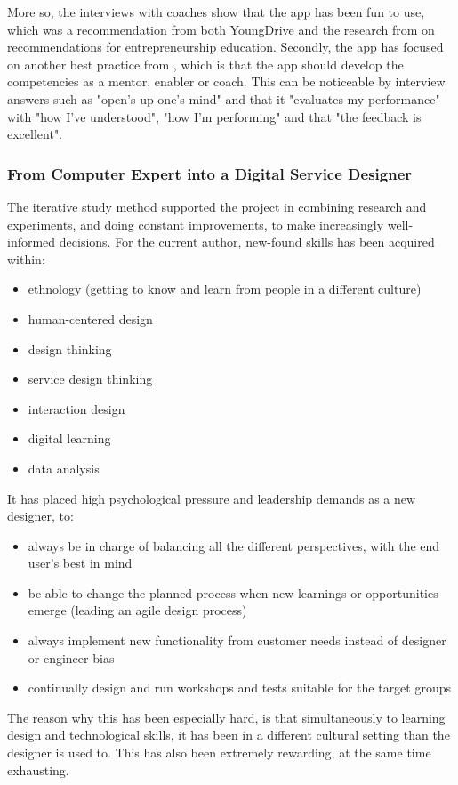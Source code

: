   More so, the interviews with coaches show that the app has been fun to use, which was a recommendation from both YoungDrive and the research from \cite{dickson} on recommendations for entrepreneurship education. Secondly, the app has focused on another best practice from \cite{dickson}, which is that the app should develop the competencies as a mentor, enabler or coach. This can be noticeable by interview answers such as "open's up one's mind" and that it "evaluates my performance" with "how I've understood", "how I'm performing" and that "the feedback is excellent".

  \subsubsection{From Computer Expert into a Digital Service Designer}
  The iterative study method supported the project in combining research and experiments, and doing constant improvements, to make increasingly well-informed decisions. For the current author, new-found skills has been acquired within:
  \begin{itemize}
  \item ethnology (getting to know and learn from people in a different culture)
  \item human-centered design
  \item design thinking
  \item service design thinking
  \item interaction design
  \item digital learning
  \item data analysis
  \end{itemize}

  It has placed high psychological pressure and leadership demands as a new designer, to:
  \begin{itemize}
  \item always be in charge of balancing all the different perspectives, with the end user's best in mind
  \item be able to change the planned process when new learnings or opportunities emerge (leading an agile design process)
  \item always implement new functionality from customer needs instead of designer or engineer bias
  \item continually design and run workshops and tests suitable for the target groups
  \end{itemize}

  The reason why this has been especially hard, is that simultaneously to learning design and technological skills, it has been in a different cultural setting than the designer is used to. This has also been extremely rewarding, at the same time exhausting.

